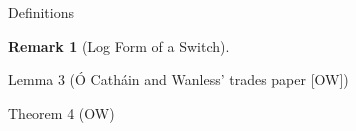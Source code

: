 \documentclass{beamer}
\newtheorem{remark}{Remark}
\begin{document}
\begin{frame}{Definitions}
    \begin{definition}[Trade]
        
    \end{definition}
    \pause
    \begin{definition}[Switch]
        
    \end{definition}
    \pause
    \begin{remark}[Log Form of a Switch]
        
    \end{remark}
\end{frame}
\begin{frame}{Lemma 3 (\'{O} Cath\'{a}in and Wanless' trades paper [OW])}
    
\end{frame}
\begin{frame}{Theorem 4 (OW)}
    
\end{frame}
\end{document}
